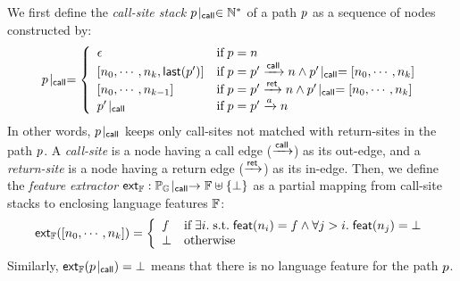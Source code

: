 
We first define the \textit{call-site stack} ${p}\!\mid_{\textsf{call}} \in \mathbb{N}^*$ of a
path $p$ as a sequence of nodes constructed by:
\begin{equation}\label{equ:css}
  {p}\!\mid_{\textsf{call}} = \left\{
    \begin{array}{ll}
      \epsilon &
      \text{if} \; p = n\\

      {[n_0, \cdots, n_k, \textsf{last}(p')]} &
      \text{if} \; p = p' \xrightarrow{\textsf{call}} n \wedge
      {p'}\!\mid_{\textsf{call}} = [n_0, \cdots, n_k]\\

      {[n_0, \cdots, n_{k-1}]} &
      \text{if} \; p = p' \xrightarrow{\textsf{ret}} n \wedge
      {p'}\!\mid_{\textsf{call}} = [n_0, \cdots, n_k]\\

      {p'}\!\mid_{\textsf{call}} &
      \text{if} \; p = p' \xrightarrow{a} n

    \end{array}
  \right.
\end{equation}
In other words, ${p}\!\mid_{\textsf{call}}$ keeps only call-sites not matched with return-sites
in the path $p$.  A \textit{call-site} is a node having a call edge ($\xrightarrow{\textsf{call}}$)
as its out-edge, and a \textit{return-site} is a node having a return edge
($\xrightarrow{\textsf{ret}}$) as its in-edge.
%
Then, we define the \textit{feature extractor} $\textsf{ext}_{\mathbb{F}}: {\mathbb{P}_{\mathbb{G}}}\!\mid_{\textsf{call}}
\rightarrow \mathbb{F} \uplus \{ \bot \}$ as a partial mapping from call-site
stacks to enclosing language features $\mathbb{F}$:
\begin{equation}\label{equ:extfeat}
  \textsf{ext}_{\mathbb{F}}([n_0, \cdots, n_k]) = \left\{
    \begin{array}{ll}
      f & \text{if} \;
      \exists i. {\; \text{s.t.} \; } \textsf{feat}(n_i) = f \wedge
      \forall j > i. \; \textsf{feat}(n_j) = \bot
      \\

      \bot & \text{otherwise}
    \end{array}
  \right.
\end{equation}
%
Similarly, $\textsf{ext}_{\mathbb{F}}({p}\!\mid_{\textsf{call}}) = \bot$ means that there is no language feature
for the path $p$.


